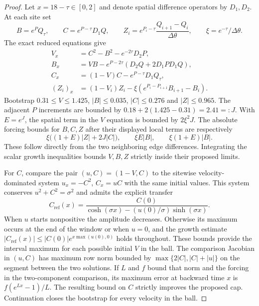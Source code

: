 \begin{proof}
Let $x=18-\tau\in[0,2]$ and denote spatial difference
operators by $D_1,D_2$. At each site set
\[
 B=e^P Q_\tau,\qquad C=e^{P-\tau}D_1Q,\qquad
 Z_i=e^{P_i-\tau}\frac{Q_{i+1}-Q_i}{\Delta\theta},
 \qquad \xi=e^{-\tau}/\Delta\theta .
\]
The exact reduced equations give
\begin{align*}
 V_x&=C^2-B^2-e^{-2\tau}D_2P,\\
 B_x&=VB-e^{P-2\tau}(D_2Q+2D_1P D_1Q),\\
 C_x&=(1-V)C-e^{P-\tau}D_1Q_\tau,\\
 (Z_i)_x&=(1-V_i)Z_i-\xi
          (e^{P_i-P_{i+1}}B_{i+1}-B_i).
\end{align*}
Bootstrap $0.31\le V\le1.425$,
$|B|\le0.035$, $|C|\le0.276$ and $|Z|\le0.965$.
The adjacent $P$ increments are bounded by
$0.18+2(1.425-0.31)=2.41=:J$.
With $E=e^J$, the spatial term in the $V$ equation is
bounded by $2\xi^2 J$. The absolute forcing bounds
for $B,C,Z$ after their displayed local terms are
respectively
\[
 \xi\big((1+E)|Z|+2J|C|\big),\qquad
 \xi E|B|,\qquad \xi(1+E)|B|.
\]
These follow directly from the two neighboring edge
differences. Integrating the scalar growth inequalities
bounds $V,B,Z$ strictly inside their proposed limits.

For $C$, compare the pair $(u,C)=(1-V,C)$ to the
sitewise velocity-dominated system
$u_x=-C^2$, $C_x=uC$ with the same initial values.
This system conserves $u^2+C^2=\sigma^2$ and admits the
explicit transfer
\[
 C_{\mathrm{ref}}(x)
 =\frac{C(0)}{\cosh(\sigma x)-(u(0)/\sigma)\sinh(\sigma x)}.
\]
When $u$ starts nonpositive the amplitude decreases.
Otherwise its maximum occurs at the end of the window
or when $u=0$, and the growth estimate
$|C_{\mathrm{ref}}(x)|\le |C(0)|e^{x\max(u(0),0)}$
holds throughout. These bounds provide the interval
maximum for each possible initial $V$ in the ball.
The comparison Jacobian in $(u,C)$ has maximum row
norm bounded by
$\max\{2|C|,|C|+|u|\}$ on the segment between the
two solutions. If $L$ and $f$ bound that norm and
the forcing in the two-component comparison, its
maximum error at backward time $x$ is
$f(e^{Lx}-1)/L$. The resulting bound on $C$ strictly
improves the proposed cap. Continuation closes the
bootstrap for every velocity in the ball.


\end{proof}
